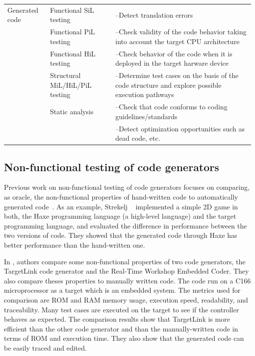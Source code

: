 \begin{table}[H]
{\begin{tabular}{| p{} | p{} |p{} |}
			Generated code 
			& Functional SiL testing & --Detect translation errors \\
			\cline{2-3}
			& Functional PiL testing & --Check validity of the code behavior taking into account the target CPU architecture \\
			\cline{2-3}
			& Functional HiL testing & --Check behavior of the code when it is deployed in the target harware device \\
			\cline{2-3}
			& Structural MiL/HiL/PiL testing & --Determine test cases on the basis of the code structure and explore possible execution pathways \\
			\cline{2-3}
			& Static analysis & --Check that code conforms to coding guidelines/standards\\
			&& --Detect optimization opportunities such as dead code, etc. \\
			\hline
		\end{tabular}}
		\label{tab:targetlink}
	\end{table}
 


\subsection{Non-functional testing of code generators}
\label{sec:Non-functional testing of code generators}
Previous work on non-functional testing of code generators focuses on comparing, as oracle, the non-functional properties of hand-written code to automatically generated code~\cite{stepasyuk2015evaluating,richard2013efficient}. As an example, Strekelj \etal~\cite{vstrekelj2015performance} implemented a simple 2D game in both, the Haxe programming language (a high-level language) and the target programming language, and evaluated the difference in performance between the two versions of code. They showed that the generated code through Haxe has better performance than the hand-written one. 

In \cite{ajwad2007evaluation}, authors compare some non-functional properties of two code generators, the TargetLink code generator and the Real-Time Workshop Embedded Coder. They also compare theses properties to manually written code. The code run on a C166 microprocessor as a target which is an embedded system.
The metrics used for comparison are ROM and RAM memory usage, execution speed, readability, and traceability. Many test cases are executed on the target to see if the controller behaves as expected.
The comparison results show that TargetLink is more efficient than the other code generator and than the manually-written code in terms of ROM and execution time. They also show that the generated code can be easily traced and edited.

